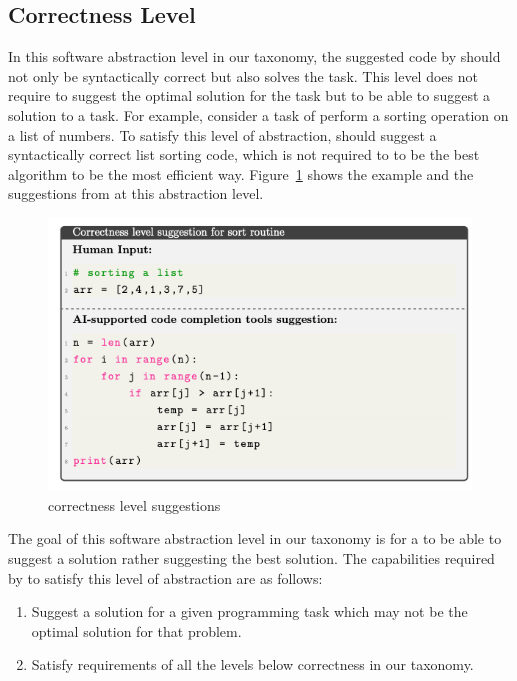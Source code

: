 \subsection{Correctness Level}
\label{correctness}
In this software abstraction level in our taxonomy, the suggested code by \cct{} should not only be syntactically correct but also solves the task. 
This level does not require \cct{} to suggest the optimal solution for the task but to be able to suggest a solution to a task.
For example, consider a task of perform a sorting operation on a list of numbers. To satisfy this level of abstraction, \cct{} should suggest a syntactically correct list sorting code, which is not required to to be the best algorithm to be the most efficient way.
Figure~\ref{fig:correctness} shows the example and the suggestions from \cct{} at this abstraction level.

\begin{figure}[hbt!]
    \centering
    \includegraphics[width=.9\linewidth]{Figures/correctness.png}
    \caption{\cct{} correctness level suggestions}
    \label{fig:correctness}
\end{figure}

The goal of this software abstraction level in our taxonomy is for a \cct{} to be able to suggest a solution rather suggesting the best solution.
The capabilities required by \cct{} to satisfy this level of abstraction are as follows:

\begin{enumerate}
    \item Suggest a solution for a given programming task which may not be the optimal solution for that problem.
    \item Satisfy requirements of all the levels below correctness in our taxonomy.
\end{enumerate}

